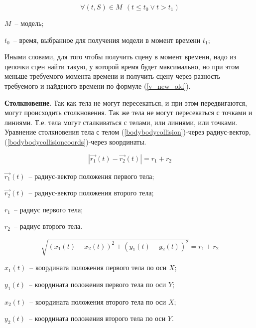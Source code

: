 \begin{equation}\label{forall_1}
  \forall (t, S) \in M~~(t \leqslant  t_0 \vee t > t_1)
\end{equation}

\begin{Underequation}
  \(M\)~-- модель;

  \(t_0\)~-- время, выбранное для получения модели в момент времени \(t_1\);
\end{Underequation}

Иными словами, для того чтобы получить сцену в момент времени, надо из цепочки сцен найти такую,
у которой время будет максимально, но при этом меньше требуемого момента времени и получить
сцену через разность требуемого и найденого времени по формуле (\ref{v_new_old}).

\textbf{Столкновение}. Так как тела не могут пересекаться, и при этом передвигаются, могут происходить столкновения.
Так же тела не могут пересекаться с точками и линиями. Т.е. тела могут сталкиваться с телами, или линиями, или точками.
Уравнение столкновения тела с телом (\ref{bodybodycollision})-через радиус-вектор, (\ref{bodybodycollisioncoords})-через координаты.

\begin{equation}\label{bodybodycollision}
  \left|\vec{r_1}(t) - \vec{r_2}(t)\right| = r_1 + r_2
\end{equation}

\begin{Underequation}
  \(\vec{r_1}(t)\)~-- радиус-вектор положения первого тела;

  \(\vec{r_2}(t)\)~-- радиус-вектор положения второго тела;

  \(r_1\)~-- радиус первого тела;

  \(r_2\)~-- радиус второго тела.
\end{Underequation}

\begin{equation}\label{bodybodycollisioncoords}
  \sqrt{(x_1(t) - x_2(t))^2 + (y_1(t) - y_2(t))^2} = r_1 + r_2
\end{equation}

\begin{Underequation}
  \(x_1(t)\)~-- координата положения первого тела по оси \(X\);

  \(y_1(t)\)~-- координата положения первого тела по оси \(Y\);

  \(x_2(t)\)~-- координата положения второго тела по оси \(X\);

  \(y_2(t)\)~-- координата положения второго тела по оси \(Y\).
\end{Underequation}

